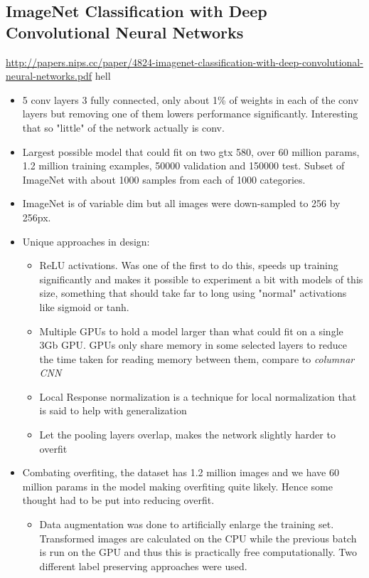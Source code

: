 \documentclass[11pt]{article}
\begin{document}
\subsection{ImageNet Classification with Deep Convolutional Neural Networks}
\label{sec:orge943263}
\url{http://papers.nips.cc/paper/4824-imagenet-classification-with-deep-convolutional-neural-networks.pdf}
hell
\begin{itemize}
\item 5 conv layers 3 fully connected, only about 1\% of weights in each of the conv layers but removing one of them lowers performance significantly. Interesting that so "little" of the network actually is conv.
\item Largest possible model that could fit on two gtx 580, over 60 million params, 1.2 million training examples, 50000 validation and 150000 test. Subset of ImageNet with about 1000 samples from each of 1000 categories.
\item ImageNet is of variable dim but all images were down-sampled to 256 by 256px.
\item Unique approaches in design:
\begin{itemize}
\item ReLU activations. Was one of the first to do this, speeds up training significantly and makes it possible to experiment a bit with models of this size, something that should take far to long using "normal" activations like sigmoid or tanh.
\item Multiple GPUs to hold a model larger than what could fit on a single 3Gb GPU. GPUs only share memory in some selected layers to reduce the time taken for reading memory between them, compare to \emph{columnar CNN}
\item Local Response normalization is a technique for local normalization that is said to help with generalization
\item Let the pooling layers overlap, makes the network slightly harder to overfit
\end{itemize}
\item Combating overfiting, the dataset has 1.2 million images and we have 60 million params in the model making overfiting quite likely. Hence some thought had to be put into reducing overfit.
\begin{itemize}
\item Data augmentation was done to artificially enlarge the training set. Transformed images are calculated on the CPU while the previous batch is run on the GPU and thus this is practically free computationally. Two different label preserving approaches were used. 

\end{itemize}
\end{itemize}
\end{document}
